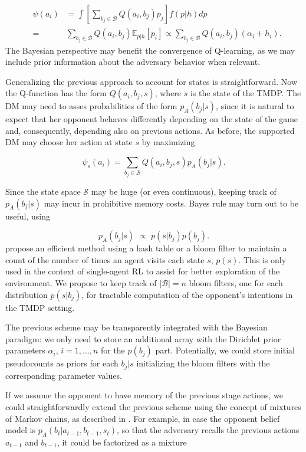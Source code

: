 \documentclass[letterpaper]{article} %
\begin{document}
\begin{eqnarray*}
& \psi(a_i) & = \int \left[\sum_{b_j \in \mathcal{B}} Q(a_i, b_j) p_j\right] f(p|h) dp \\
&=& \sum_{b_j \in \mathcal{B}} Q(a_i, b_j) \mathbb{E}_{p|h}[p_i] \propto  \sum_{b_j \in \mathcal{B}} Q(a_i, b_j) (\alpha_i + h_i).
\end{eqnarray*}
The Bayesian perspective may benefit the convergence of Q-learning, as we may include prior information about the adversary behavior when relevant.

Generalizing the previous approach to account for states is straightforward. Now the Q-function has the form $Q(a_i, b_j, s)$, where $s$ is the state of the TMDP. The DM may need to asses probabilities of the form $p_A(b_j | s)$, since it is natural to expect that her opponent behaves differently depending on the state of the game and, consequently, depending also on previous actions. As before, the supported DM may choose her action at state $s$ by maximizing

\[ \psi_s(a_i) = \sum_{b_j \in \mathcal{B}} Q(a_i, b_j,s) p_{A}(b_j|s).  \]


Since the state space $\mathcal{S}$ may be huge (or even continuous), keeping track of $p_A(b_j|s)$ may incur in prohibitive memory costs. Bayes rule may turn out to be useful, using

\[
p_{A}(b_j| s) \,\, \propto \,\, p(s| b_j)p(b_j).
\]
\cite{tang2017exploration} propose an efficient method using a hash table or a bloom filter to maintain a count of the number of times an agent visits each state $s$, $p(s)$. This is only used in the context of single-agent RL to assist for better exploration of the environment. We propose to keep track of $|\mathcal{B}| = n$ bloom filters, one for each distribution $p(s|b_j)$, for tractable computation of the opponent's intentions in the TMDP setting.

The previous scheme may be transparently integrated with the Bayesian paradigm: we only need to store an additional array with the Dirichlet prior parameters $\alpha_i$, $i=1,\ldots, n$
for the $p(b_j)$ part. Potentially, we could store initial pseudocounts as priors for each $b_j | s$ initializing the bloom filters with the corresponding parameter values.

If we assume the opponent to have memory of the previous stage actions, we could straightforwardly extend the previous scheme using the concept of mixtures of Markov chains, as described in \cite{raftery1985model}. For example, in case the opponent belief model
is $p_{A}(b_t | a_{t-1}, b_{t-1}, s_t)$, so that the adversary recalls
 the previous actions $a_{t-1}$ and $b_{t-1}$, it could be factorized as a mixture
\end{document}
